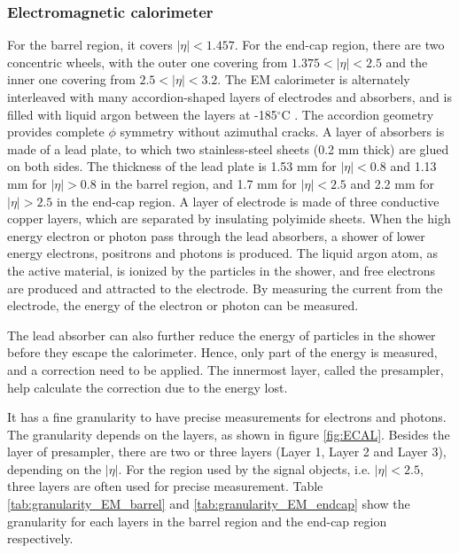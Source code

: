 \subsubsection{Electromagnetic calorimeter}
For the barrel region, it covers $|\eta| < 1.457$.
For the end-cap region, there are two concentric wheels, with the outer one covering from $1.375 <|\eta| < 2.5$ and the inner one covering from $2.5 <|\eta| < 3.2$.
The EM calorimeter is alternately interleaved with many accordion-shaped layers of electrodes and absorbers, and is filled with liquid argon between the layers at -185$^{\circ}$C .
The accordion geometry provides complete $\phi$ symmetry without azimuthal cracks.
A layer of absorbers is made of a lead plate, to which two stainless-steel sheets (0.2 mm thick) are glued on both sides.
The thickness of the lead plate is 1.53 mm for $|\eta| < 0.8$ and 1.13 mm for $|\eta| > 0.8$ in the barrel region, and 1.7 mm for $|\eta| < 2.5$ and 2.2 mm for $|\eta| > 2.5$ in the end-cap region.
A layer of electrode is made of three conductive copper layers, which are separated by insulating polyimide sheets.
When the high energy electron or photon pass through the lead absorbers, a shower of lower energy electrons, positrons and photons is produced.
The liquid argon atom, as the active material, is ionized by the particles in the shower, and free electrons are produced and attracted to the electrode.
By measuring the current from the electrode, the energy of the electron or photon can be measured.

The lead absorber can also further reduce the energy of particles in the shower before they escape the calorimeter.
Hence, only part of the energy is measured, and a correction need to be applied.
The innermost layer, called the presampler, help calculate the correction due to the energy lost.

It has a fine granularity to have precise measurements for electrons and photons.
The granularity depends on the layers, as shown in figure \ref{fig:ECAL}.
Besides the layer of presampler, there are two or three layers (Layer 1, Layer 2 and Layer 3), depending on the $|\eta|$.
For the region used by the signal objects, i.e. $|\eta|<2.5$, three layers are often used for precise measurement.
Table \ref{tab:granularity_EM_barrel} and \ref{tab:granularity_EM_endcap} show the granularity for each layers in the barrel region and the end-cap region respectively.

